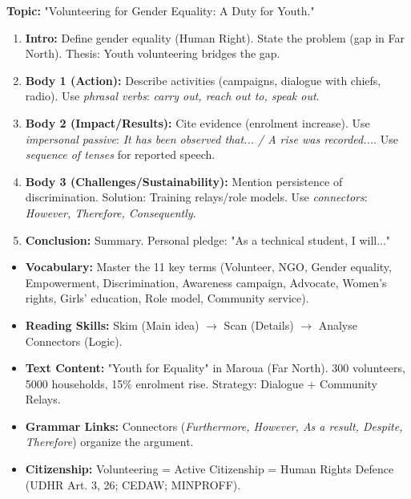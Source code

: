 \documentclass[11pt]{article}
\newcounter{popsec}
\newcounter{popsub}
\newcommand{\courssub}[1]{%
  \stepcounter{popsub}%
  \par\vspace{9pt}\noindent{\popxbold\fontsize{11.5}{13}\selectfont\color{popink}{\color{poporange}\thepopsec.\thepopsub}\hspace{6pt}#1}\par\nopagebreak\vspace{4pt}
}
\begin{document}
\begin{exemplebox}
\textbf{Topic:} "Volunteering for Gender Equality: A Duty for Youth."
\begin{enumerate}
    \item \textbf{Intro:} Define gender equality (Human Right). State the problem (gap in Far North). Thesis: Youth volunteering bridges the gap.
    \item \textbf{Body 1 (Action):} Describe activities (campaigns, dialogue with chiefs, radio). Use \textit{phrasal verbs}: \textit{carry out, reach out to, speak out}.
    \item \textbf{Body 2 (Impact/Results):} Cite evidence (enrolment increase). Use \textit{impersonal passive}: \textit{It has been observed that... / A rise was recorded...}. Use \textit{sequence of tenses} for reported speech.
    \item \textbf{Body 3 (Challenges/Sustainability):} Mention persistence of discrimination. Solution: Training relays/role models. Use \textit{connectors}: \textit{However, Therefore, Consequently}.
    \item \textbf{Conclusion:} Summary. Personal pledge: "As a technical student, I will..."
\end{enumerate}
\end{exemplebox}

\courssub{Summary Checklist}

\begin{aretenir}
\begin{itemize}
    \item \textbf{Vocabulary:} Master the 11 key terms (Volunteer, NGO, Gender equality, Empowerment, Discrimination, Awareness campaign, Advocate, Women's rights, Girls' education, Role model, Community service).
    \item \textbf{Reading Skills:} Skim (Main idea) $\rightarrow$ Scan (Details) $\rightarrow$ Analyse Connectors (Logic).
    \item \textbf{Text Content:} "Youth for Equality" in Maroua (Far North). 300 volunteers, 5000 households, 15\% enrolment rise. Strategy: Dialogue + Community Relays.
    \item \textbf{Grammar Links:} Connectors (\textit{Furthermore, However, As a result, Despite, Therefore}) organize the argument.
    \item \textbf{Citizenship:} Volunteering = Active Citizenship = Human Rights Defence (UDHR Art. 3, 26; CEDAW; MINPROFF).
\end{itemize}
\end{aretenir}
\end{document}
